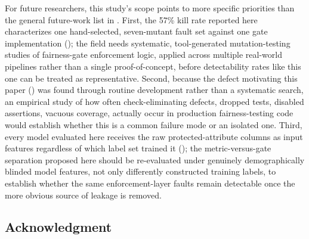 \documentclass[]{einformatica}
\begin{document}
For future researchers, this study's scope points to more specific priorities than the general future-work list in . First, the 57\% kill rate reported here characterizes one hand-selected, seven-mutant fault set against one gate implementation (); the field needs systematic, tool-generated mutation-testing studies of fairness-gate enforcement logic, applied across multiple real-world pipelines rather than a single proof-of-concept, before detectability rates like this one can be treated as representative. Second, because the defect motivating this paper () was found through routine development rather than a systematic search, an empirical study of how often check-eliminating defects, dropped tests, disabled assertions, vacuous coverage, actually occur in production fairness-testing code would establish whether this is a common failure mode or an isolated one. Third, every model evaluated here receives the raw protected-attribute columns as input features regardless of which label set trained it (); the metric-versus-gate separation proposed here should be re-evaluated under genuinely demographically blinded model features, not only differently constructed training labels, to establish whether the same enforcement-layer faults remain detectable once the more obvious source of leakage is removed.

\subsection*{Acknowledgment}








\end{document}
